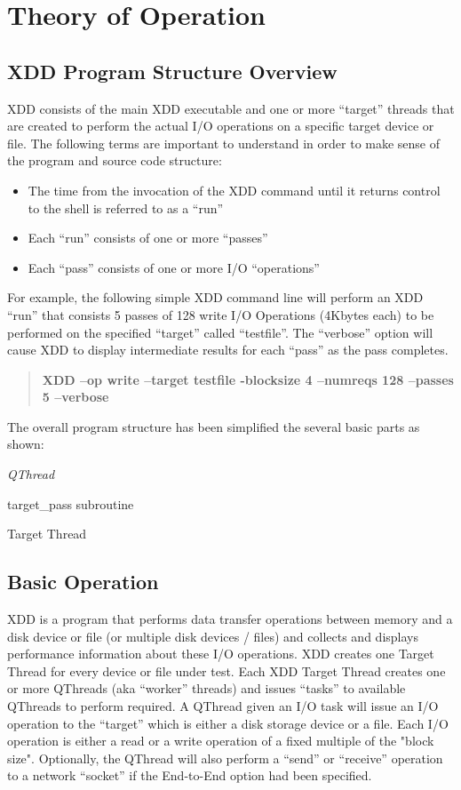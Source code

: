 \newpage
\section{Theory of Operation}\label{theory-of-operation}

\subsection{XDD Program Structure Overview}\label{xdd-program-structure-overview}

XDD consists of the main XDD executable and one or more ``target'' threads that are created to perform the actual I/O operations on a specific target device or file. The following terms are important to understand in order to make sense of the program and source code structure:

\begin{itemize}
\item
  The time from the invocation of the XDD command until it returns control to the shell is referred to as a ``run''
\item
  Each ``run'' consists of one or more ``passes''
\item
  Each ``pass'' consists of one or more I/O ``operations''
\end{itemize}

For example, the following simple XDD command line will perform an XDD ``run'' that consists 5 passes of 128 write I/O Operations (4Kbytes each) to be performed on the specified ``target'' called ``testfile''. The ``verbose'' option will cause XDD to display intermediate results for each ``pass'' as the pass completes.

\begin{quote}
\textbf{XDD --op write --target testfile -blocksize 4 --numreqs 128 --passes 5 --verbose}
\end{quote}

The overall program structure has been simplified the several basic parts as shown:

\emph{QThread}

target\_pass subroutine

Target Thread

\subsection{Basic Operation}\label{basic-operation}

XDD is a program that performs data transfer operations between memory and a disk device or file (or multiple disk devices / files) and collects and displays performance information about these I/O operations. XDD creates one Target Thread for every device or file under test. Each XDD Target Thread creates one or more QThreads (aka ``worker'' threads) and issues ``tasks'' to available QThreads to perform required. A QThread given an I/O task will issue an I/O operation to the ``target'' which is either a disk storage device or a file. Each I/O operation is either a read or a write operation of a fixed multiple of the "block size". Optionally, the QThread will also perform a ``send'' or ``receive'' operation to a network ``socket'' if the End-to-End option had been specified.


